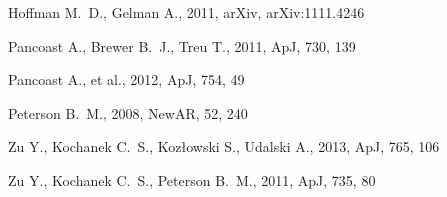 \documentclass[useAMS,usenatbib]{mn2e}
\begin{document}
\begin{thebibliography}{99}
 Hoffman M.~D., Gelman A., 2011, arXiv, arXiv:1111.4246 

 Pancoast A., Brewer B.~J., Treu T., 2011, ApJ, 730, 139 

 Pancoast A., et al., 2012, ApJ, 754, 49 

Peterson B.~M., 2008, NewAR, 52, 240 

 Zu 
Y., Kochanek C.~S., Koz{\l}owski S., Udalski A., 2013, ApJ, 765, 106 

 Zu Y., Kochanek C.~S., Peterson B.~M., 2011, ApJ, 735, 80 



\end{thebibliography}
\end{document}
